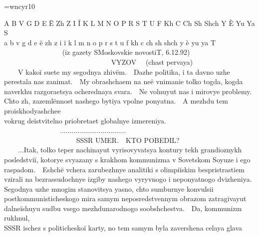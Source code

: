 
\font\tencyr=wncyr10
\def\cyr{\tencyr\cyracc}

 {\cyr A B V G D E \"E Zh Z I {\u I} K L M N O P R S T U F Kh C Ch Sh Shch {\Cdprime} Y {\Cprime} \`E Yu Ya S\\
a b v g d e \"e zh z i {\u i} k l m n o p r s t u f kh c ch sh shch {\cdprime} y {\cprime} \`e yu ya T\\
{\ \ }{\ \ }{\ \ }{\ \ }{\ \ }{\ \ }{\ \ }{\ \ } (iz gazety SMoskovskie novostiT, 6.12.92)\\
{\ \ }{\ \ }{\ \ }{\ \ }{\ \ }{\ \ }{\ \ }{\ \ }{\ \ }{\ \ }{\ \ }{\ \ }{\ \ }{\ \ }{\ \ } VYZOV{\ \ } (chast{\cprime} pervaya)\\
{\ \ }{\ \ }V kako{\u i} suete my segodnya zhiv\"em.{\ \ }Dazhe politika, i ta davno uzhe\\
perestala nas zanimat{\cprime}.{\ \ }My obrashchaem na ne\"e vnimanie tol{\cprime}ko togda, kogda\\
naverkhu razgoraet{\cydot}sya ocherednaya svara.{\ \ }Ne volnuyut nas i mirovye problemy.\\
Chto zh, zazeml\"ennost{\cprime} nashego bytiya vpolne ponyatna.{\ \ }A mezhdu tem proiskhodyashchee\\
vokrug de{\u i}stvitel{\cprime}no priobretaet global{\cprime}nye izmereniya.\\
{\ \ }{\ \ }{\ \ }{\ \ }{\ \ }{\ \ }{\ \ }{\ \ }..................................\\
{\ \ }{\ \ }{\ \ }{\ \ }{\ \ }{\ \ }{\ \ }{\ \ }{\ \ }{\ \ } SSSR UMER.{\ \ }KTO POBEDIL?\\
{\ \ }{\ \ }...Itak, tol{\cprime}ko teper{\cprime} nachinayut vyrisovyvat{\cprime}sya kontury tekh grandioznykh\\
posledstvi{\u i}, kotorye svyazany s krakhom kommunizma v Sovet{\cydot}skom Soyuze i ego\\
raspadom.{\ \ }Eshch\"e vchera zarubezhnye analitiki s olimpi{\u i}skim bespristrastiem\\
vzirali na bezrassudochnye izgiby nashego vyryvnogo i neponyatnogo dvizheniya.\\
Segodnya uzhe mnogim stanovit{\cydot}sya yasno, chto sumburnye konvul{\cprime}sii\\
postkommunisticheskogo mira samym neposredstvennym obrazom zatragivayut\\
dal{\cprime}ne{\u i}shuyu sud{\cprime}bu vsego mezhdunarodnogo soobshchestva.{\ \ }Da, kommunizm rukhnul,\\
SSSR ischez s politichesko{\u i} karty, no tem samym byla zavershena celaya glava\\
}
